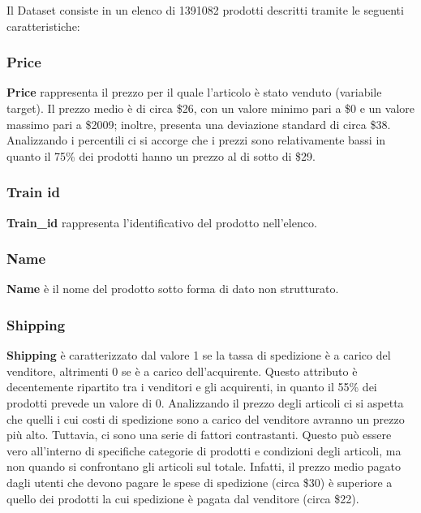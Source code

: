 
Il Dataset consiste in un elenco di 1391082 prodotti descritti tramite le seguenti caratteristiche:
\subsubsection{Price}
\textbf{Price} rappresenta il prezzo per il quale l'articolo è stato venduto (variabile target).
Il prezzo medio è di circa \$26, con un valore minimo pari a \$0 e un valore massimo pari a \$2009; inoltre, presenta una deviazione standard di circa \$38.
Analizzando i percentili ci si accorge che i prezzi sono relativamente bassi in quanto il 75\% dei prodotti hanno un prezzo al di sotto di \$29.
\subsubsection{Train id}
\textbf{Train\_id} rappresenta l'identificativo del prodotto nell'elenco.
\subsubsection{Name}
\textbf{Name} è il nome del prodotto sotto forma di dato non strutturato.
\subsubsection{Shipping}
\textbf{Shipping} è caratterizzato dal valore 1 se la tassa di spedizione è a carico del venditore, altrimenti 0 se è a carico dell'acquirente.
Questo attributo è decentemente ripartito tra i venditori e gli acquirenti, in quanto il 55\% dei prodotti prevede un valore di 0.
Analizzando il prezzo degli articoli ci si aspetta che quelli i cui costi di spedizione sono a carico del venditore avranno un prezzo più alto. Tuttavia, ci sono una serie di fattori contrastanti. Questo può essere vero all'interno di specifiche categorie di prodotti e condizioni degli articoli, ma non quando si confrontano gli articoli sul totale. 
Infatti, il prezzo medio pagato dagli utenti che devono pagare le spese di
spedizione (circa \$30) è superiore a quello dei prodotti la cui spedizione è pagata dal venditore (circa \$22).
